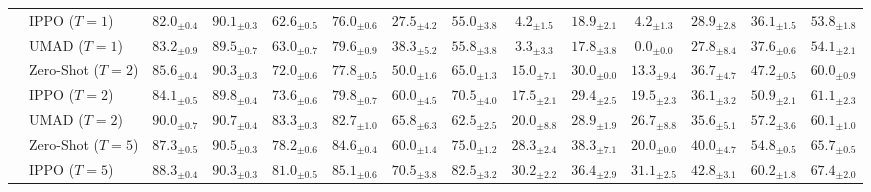 \documentclass{article}
\newcommand{\bg}[2][0]{\cellcolor{MBlue!#1}#2}
\newcommand{\bged}[2][0]{\cellcolor{MPink!#1}#2}
\newcommand{\bgbase}[1]{\cellcolor{MGray!100}#1}
\newcommand{\sd}[2]{{#1}_{\pm#2}}
\newcommand{\sdb}[2]{\mathbf{#1}_{\pm#2}}
\theoremstyle{plain}
\theoremstyle{definition}
\theoremstyle{remark}
\begin{document}
\begin{table}[t]
{\begin{tabular}{l|l|cc|cc|cc|cc|cc|cc}
& IPPO ($T=1$) & \bged[10]{$\sd{82.0}{0.4}$} & \bged[5]{$\sd{90.1}{0.3}$} & \bged[10]{$\sd{62.6}{0.5}$} & \bg[10]{$\sd{76.0}{0.6}$} & \bged[35]{$\sd{27.5}{4.2}$} & \bged[20]{$\sd{55.0}{3.8}$} & \bged[5]{$\sd{4.2}{1.5}$} & \bged[5]{$\sd{18.9}{2.1}$} & \bged[5]{$\sd{4.2}{1.3}$} & \bged[5]{$\sd{28.9}{2.8}$} & \bged[25]{$\sd{36.1}{1.5}$} & \bged[10]{$\sd{53.8}{1.8}$} \\
& UMAD ($T=1$) & \bg[10]{$\sd{83.2}{0.9}$} & \bged[10]{$\sd{89.5}{0.7}$} & \bged[10]{$\sd{63.0}{0.7}$} & \bg[35]{$\sd{79.6}{0.9}$} & \bg[10]{$\sd{38.3}{5.2}$} & \bged[15]{$\sd{55.8}{3.8}$} & \bged[10]{$\sd{3.3}{3.3}$} & \bged[10]{$\sd{17.8}{3.8}$} & \bged[25]{$\sd{0.0}{0.0}$} & \bged[10]{$\sd{27.8}{8.4}$} & \bged[10]{$\sd{37.6}{0.6}$} & \bged[10]{$\sd{54.1}{2.1}$} \\
\cmidrule(l{0pt}r{0pt}){2-14}
& \bgbase{Zero-Shot ($T=2$)} & \bgbase{$\sd{85.6}{0.4}$} & \bgbase{$\sd{90.3}{0.3}$} & \bgbase{$\sd{72.0}{0.6}$} & \bgbase{$\sd{77.8}{0.5}$} & \bgbase{$\sd{50.0}{1.6}$} & \bgbase{$\sd{65.0}{1.3}$} & \bgbase{$\sd{15.0}{7.1}$} & \bgbase{$\sd{30.0}{0.0}$} & \bgbase{$\sd{13.3}{9.4}$} & \bgbase{$\sd{36.7}{4.7}$} & \bgbase{$\sd{47.2}{0.5}$} & \bgbase{$\sd{60.0}{0.9}$}\\
& IPPO ($T=2$) & \bged[15]{$\sd{84.1}{0.5}$} & \bged[10]{$\sd{89.8}{0.4}$} & \bg[20]{$\sd{73.6}{0.6}$} & \bg[25]{$\sd{79.8}{0.7}$} & \bg[35]{$\sd{60.0}{4.5}$} & \bg[25]{$\sd{70.5}{4.0}$} & \bg[15]{$\sd{17.5}{2.1}$} & \bged[5]{$\sd{29.4}{2.5}$} & \bg[25]{$\sd{19.5}{2.3}$} & \bged[5]{$\sd{36.1}{3.2}$} & \bg[35]{$\sd{50.9}{2.1}$} & \bg[10]{$\sd{61.1}{2.3}$} \\
& UMAD ($T=2$) & \bg[35]{$\sd{90.0}{0.7}$} & \bg[10]{$\sd{90.7}{0.4}$} & \bg[55]{$\sd{83.3}{0.3}$} & \bg[45]{$\sd{82.7}{1.0}$} & \bg[45]{$\sd{65.8}{6.3}$} & \bged[15]{$\sd{62.5}{2.5}$} & \bg[20]{$\sd{20.0}{8.8}$} & \bged[5]{$\sd{28.9}{1.9}$} & \bg[40]{$\sd{26.7}{8.8}$} & \bged[5]{$\sd{35.6}{5.1}$} & \bg[60]{$\sd{57.2}{3.6}$} & \bg[5]{$\sd{60.1}{1.0}$}\\
\cmidrule(l{0pt}r{0pt}){2-14}
& \bgbase{Zero-Shot ($T=5$)} & \bgbase{$\sd{87.3}{0.5}$} & \bgbase{$\sd{90.5}{0.3}$} & \bgbase{$\sd{78.2}{0.6}$} & \bgbase{$\sd{84.6}{0.4}$} & \bgbase{$\sd{60.0}{1.4}$} & \bgbase{$\sd{75.0}{1.2}$} & \bgbase{$\sd{28.3}{2.4}$} & \bgbase{$\sdb{38.3}{7.1}$} & \bgbase{$\sd{20.0}{0.0}$} & \bgbase{$\sd{40.0}{4.7}$} & \bgbase{$\sd{54.8}{0.5}$} & \bgbase{$\sd{65.7}{0.5}$}\\
& IPPO ($T=5$) & \bg[15]{$\sd{88.3}{0.4}$} & \bged[5]{$\sd{90.3}{0.3}$} & \bg[25]{$\sd{81.0}{0.5}$} & \bg[10]{$\sd{85.1}{0.6}$} & \bg[40]{$\sd{70.5}{3.8}$} & \bg[25]{$\sdb{82.5}{3.2}$} & \bg[10]{$\sd{30.2}{2.2}$} & \bged[5]{$\sd{36.4}{2.9}$} & \bg[45]{$\sd{31.1}{2.5}$} & \bg[10]{$\sd{42.8}{3.1}$} & \bg[55]{$\sd{60.2}{1.8}$} & \bg[15]{$\sdb{67.4}{2.0}$} \\

\end{tabular}}
\end{table}
\end{document}
